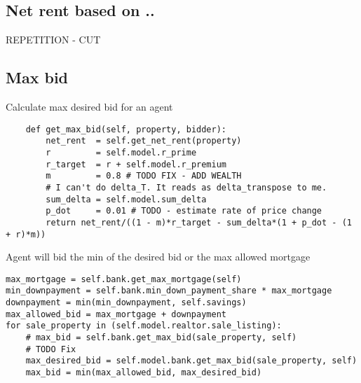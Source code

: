 \subsection{Net rent based on ..}

REPETITION - CUT



\subsection{Max bid}

Calculate max desired bid for an agent
\begin{lstlisting}
    def get_max_bid(self, property, bidder):
        net_rent  = self.get_net_rent(property)
        r         = self.model.r_prime   
        r_target  = r + self.model.r_premium
        m         = 0.8 # TODO FIX - ADD WEALTH
        # I can't do delta_T. It reads as delta_transpose to me.
        sum_delta = self.model.sum_delta 
        p_dot     = 0.01 # TODO - estimate rate of price change
        return net_rent/((1 - m)*r_target - sum_delta*(1 + p_dot - (1 + r)*m))
\end{lstlisting}

Agent will bid the min of the desired bid or the max allowed mortgage
\begin{lstlisting}
max_mortgage = self.bank.get_max_mortgage(self)
min_downpayment = self.bank.min_down_payment_share * max_mortgage
downpayment = min(min_downpayment, self.savings)
max_allowed_bid = max_mortgage + downpayment
for sale_property in (self.model.realtor.sale_listing):
    # max_bid = self.bank.get_max_bid(sale_property, self)
    # TODO Fix
    max_desired_bid = self.model.bank.get_max_bid(sale_property, self)
    max_bid = min(max_allowed_bid, max_desired_bid)
\end{lstlisting}

